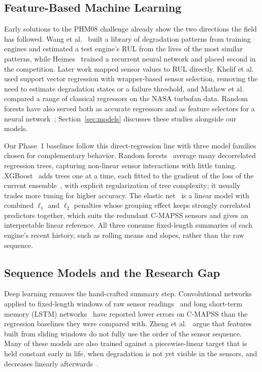 \subsection{Feature-Based Machine Learning}
Early solutions to the PHM08 challenge already show the two directions the field has
followed. Wang et al.~\cite{Wang2008similarity} built a library of degradation patterns
from training engines and estimated a test engine's RUL from the lives of the most
similar patterns, while Heimes~\cite{Heimes2008recurrent} trained a recurrent neural
network and placed second in the competition. Later work mapped sensor values to RUL
directly. Khelif et al.~\cite{Khelif2017direct} used support vector regression with
wrapper-based sensor selection, removing the need to estimate degradation states or a
failure threshold, and Mathew et al.~\cite{Mathew2017prediction} compared a range of
classical regressors on the NASA turbofan data. Random forests have also served both as
accurate regressors and as feature selectors for a neural
network~\cite{Wu2017comparative,Wang2023remaining}; Section~\ref{sec:models} discusses
these studies alongside our models.

Our Phase~1 baselines follow this direct-regression line with three model families
chosen for complementary behavior. Random forests~\cite{Breiman2001random} average
many decorrelated regression trees, capturing non-linear sensor interactions with
little tuning. XGBoost~\cite{Chen2016xgboost} adds trees one at a time, each fitted to
the gradient of the loss of the current ensemble~\cite{Friedman2001greedy}, with
explicit regularization of tree complexity; it usually trades more tuning for higher
accuracy. The elastic
net~\cite{Zou2005regularization} is a linear model with combined $\ell_1$ and $\ell_2$
penalties whose grouping effect keeps strongly correlated predictors together, which
suits the redundant C-MAPSS sensors and gives an interpretable linear reference. All
three consume fixed-length summaries of each engine's recent history, such as rolling
means and slopes, rather than the raw sequence.

\subsection{Sequence Models and the Research Gap}
Deep learning removes the hand-crafted summary step. Convolutional networks applied to
fixed-length windows of raw sensor readings~\cite{SateeshBabu2016deep,Li2018remaining}
and long short-term memory (LSTM) networks~\cite{Hochreiter1997long,Zheng2017long} have
reported lower errors on C-MAPSS than the regression baselines they were compared with.
Zheng et al.~\cite{Zheng2017long} argue that features built from sliding windows do not
fully use the order of the sensor sequence. Many of these models are also trained
against a piecewise-linear target that is held constant early in life, when degradation
is not yet visible in the sensors, and decreases linearly
afterwards~\cite{Heimes2008recurrent,SateeshBabu2016deep,Zheng2017long,Li2018remaining}.

